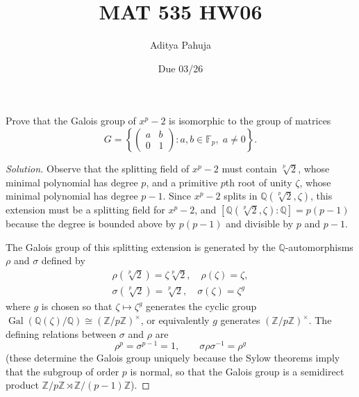 \documentclass[10pt]{article}
\title{MAT 535 HW06}
\author{\large Aditya Pahuja}
\date{\large Due 03/26}
\providecommand{\Gal}{\operatorname{Gal}}
\providecommand{\FF}{\mathbb F}
\providecommand{\QQ}{\mathbb Q}
\providecommand{\ZZ}{\mathbb Z}
\providecommand{\inv}{^{-1}}
\newenvironment{soln}{\begin{proof}[Solution]}{\end{proof}}
\begin{document}
\maketitle

\begin{problem}
    [\S14.2\#5]
    Prove that the Galois group of $x^p - 2$ is isomorphic
    to the group of matrices
    \begin{equation*}
	G = \left\{\begin{pmatrix}
	    a&b\\0&1
	\end{pmatrix} : a,b\in\FF_p,\; a\ne 0\right\}.
    \end{equation*}
\end{problem}

\begin{soln}
    Observe that the splitting field of $x^p - 2$
    must contain $\sqrt[p]2$,
    whose minimal polynomial has degree $p$, and
    a primitive $p$th root of unity $\zeta$,
    whose minimal polynomial has degree $p-1$.
    Since $x^p - 2$ splits in $\QQ(\sqrt[p]2,\zeta)$,
    this extension must be a splitting field for $x^p-2$,
    and $[\QQ(\sqrt[p]2,\zeta) : \QQ] = p(p-1)$ because
    the degree is bounded above by $p(p-1)$
    and divisible by $p$ and $p-1$.

    The Galois group of this splitting extension is generated
    by the $\QQ$-automorphisms $\rho$ and $\sigma$ defined by
    \begin{gather*}
	\rho(\sqrt[p]2) = \zeta\sqrt[p]2,\quad \rho(\zeta) = \zeta,\\
	\sigma(\sqrt[p]2) = \sqrt[p]2,\quad \sigma(\zeta) = \zeta^g
    \end{gather*}
    where $g$ is chosen so that $\zeta\mapsto\zeta^g$
    generates the cyclic group $\Gal(\QQ(\zeta)/\QQ)\cong(\ZZ/p\ZZ)^\times$,
    or equivalently $g$ generates $(\ZZ/p\ZZ)^\times$.
    The defining relations between $\sigma$ and $\rho$ are
    \begin{equation*}
	\rho^p = \sigma^{p-1} = 1,\qquad \sigma\rho\sigma\inv = \rho^g
    \end{equation*}
    (these determine the Galois group uniquely
    because the Sylow theorems imply that the subgroup of order $p$ is normal,
    so that the Galois group is a semidirect product
    $\ZZ/p\ZZ \rtimes \ZZ/(p-1)\ZZ$).


\end{soln}
\end{document}
